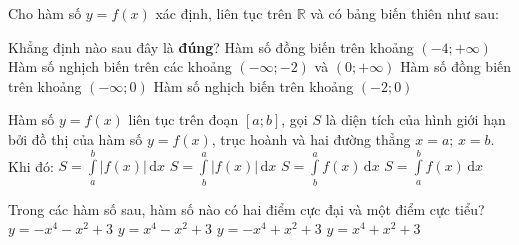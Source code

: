 \begin{ex}%
	Cho hàm số $ y=f(x) $ xác định, liên tục trên $ \mathbb{R} $ và có bảng biến thiên như sau:
	\begin{center}
	\end{center}
	Khẳng định nào sau đây là \textbf{đúng}?
	\choice
	{Hàm số đồng biến trên khoảng $( -4;+\infty )$}
	{Hàm số nghịch biến trên các khoảng $ (-\infty;-2) $ và $ (0;+\infty) $}
	{Hàm số đồng biến trên khoảng $ (-\infty;0) $}
	{\True Hàm số nghịch biến trên khoảng $ (-2;0) $}
\end{ex}

\begin{ex}%
	Hàm số $ y=f(x) $ liên tục trên đoạn $ [a;b] $, gọi $ S $ là diện tích của hình giới hạn bởi đồ thị của hàm số $ y=f(x) $, trục hoành và hai đường thẳng $ x=a;\, x=b $. Khi đó:
	\choice
	{\True $S=\displaystyle\int\limits_{a}^{b}|f(x)|\mathrm{\, d}x$}
	{$S=\displaystyle\int\limits_{b}^{a}|f(x)|\mathrm{\, d}x$}
	{$S=\displaystyle\int\limits_{b}^{a}f(x)\mathrm{\, d}x$}
	{$S=\displaystyle\int\limits_{a}^{b}f(x)\mathrm{\, d}x$}
\end{ex}

\begin{ex}%
	Trong các hàm số sau, hàm số nào có hai điểm cực đại và một điểm cực tiểu?
	\choice
	{$y=-x^4-x^2+3$}
	{$y=x^4-x^2+3$}
	{\True $y=-x^4+x^2+3$}
	{$y=x^4+x^2+3$}
\end{ex}

